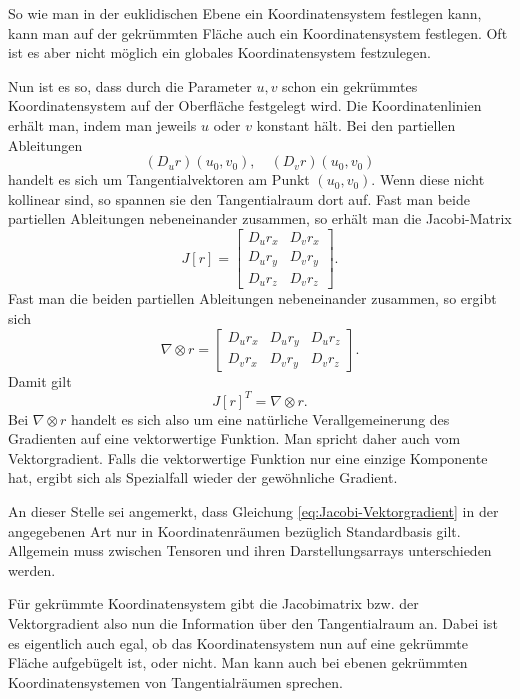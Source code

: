 \documentclass[a4paper,12pt,fleqn]{article}
\begin{document}
So wie man in der euklidischen Ebene ein Koordinatensystem
festlegen kann, kann man auf der gekrümmten Fläche auch
ein Koordinatensystem festlegen. Oft ist es aber nicht möglich
ein globales Koordinatensystem festzulegen.

Nun ist es so, dass durch die Parameter $u,v$ schon ein
gekrümmtes Koordinatensystem auf der Oberfläche festgelegt wird.
Die Koordinatenlinien erhält man, indem man jeweils $u$ oder $v$
konstant hält. Bei den partiellen Ableitungen
\begin{equation}
(D_u r)(u_0,v_0),\quad (D_v r)(u_0,v_0)
\end{equation}
handelt es sich um Tangentialvektoren am Punkt $(u_0,v_0)$.
Wenn diese nicht kollinear sind, so spannen sie den
Tangentialraum dort auf. Fast man beide partiellen Ableitungen
nebeneinander zusammen, so erhält man die Jacobi-Matrix
\begin{equation}
J[r] = \begin{bmatrix}
D_u r_x & D_v r_x\\
D_u r_y & D_v r_y\\
D_u r_z & D_v r_z
\end{bmatrix}.
\end{equation}
Fast man die beiden partiellen Ableitungen nebeneinander
zusammen, so ergibt sich
\begin{equation}
\nabla\otimes r = \begin{bmatrix}
D_u r_x & D_u r_y & D_u r_z\\
D_v r_x & D_v r_y & D_v r_z
\end{bmatrix}.
\end{equation}
Damit gilt
\begin{equation}\label{eq:Jacobi-Vektorgradient}
J[r]^T=\nabla\otimes r.
\end{equation}
Bei $\nabla\otimes r$
handelt es sich also um eine natürliche Verallgemeinerung
des Gradienten auf eine vektorwertige Funktion. Man spricht
daher auch vom Vektorgradient. Falls die vektorwertige Funktion
nur eine einzige Komponente hat, ergibt sich als Spezialfall
wieder der gewöhnliche Gradient.

An dieser Stelle sei angemerkt, dass Gleichung
\eqref{eq:Jacobi-Vektorgradient} in der angegebenen Art nur
in Koordinatenräumen bezüglich Standardbasis gilt.
Allgemein muss zwischen Tensoren und ihren Darstellungsarrays
unterschieden werden. 

Für gekrümmte Koordinatensystem gibt die Jacobimatrix bzw. der
Vektorgradient also nun die Information über den Tangentialraum
an. Dabei ist es eigentlich auch egal, ob das Koordinatensystem nun
auf eine gekrümmte Fläche aufgebügelt ist, oder nicht. Man kann
auch bei ebenen gekrümmten Koordinatensystemen von Tangentialräumen
sprechen.
\end{document}
